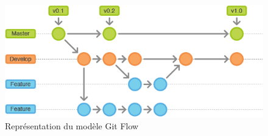 \begin{figure}[H]
    \includegraphics[width=\linewidth]{images/gitflow.png}
    \caption{Représentation du modèle Git Flow}\label{fig:gitflow}
\end{figure}